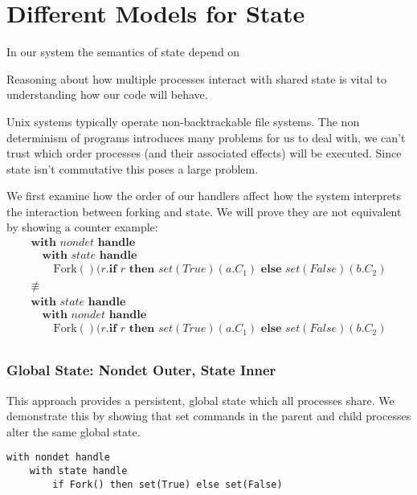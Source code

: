 \documentclass[logo,bsc,singlespacing,parskip]{infthesis}
\begin{document}
\section{Different Models for State}

In our system the semantics of state depend on 

Reasoning about how multiple processes interact with shared state is vital to understanding how our code will behave. 

Unix systems typically operate non-backtrackable file systems. The non determinism of programs introduces many problems for us to deal with, we can't trust which order processes (and their associated effects) will be executed. Since state isn't commutative this poses a large problem.

We first examine how the order of our handlers affect how the system interprets the interaction between forking and state. We will prove they are not equivalent by showing a counter example:
\[
\begin{array}{l}
\textbf{with } \mathit{nondet} \textbf{ handle } \\
\quad \textbf{with } \mathit{state} \textbf{ handle } \\
\quad\quad \text{Fork}()(r. \textbf{if } r \textbf{ then } set(True)(a.C_1) \textbf{ else } set(False)(b.C_2) \\[5pt]
\not\equiv\quad  \\
\textbf{with } \mathit{state} \textbf{ handle } \\
\quad \textbf{with } \mathit{nondet} \textbf{ handle } \\
\quad\quad \text{Fork}()(r. \textbf{if } r \textbf{ then } set(True)(a.C_1) \textbf{ else } set(False)(b.C_2) \\[5pt]
\end{array}
\]

\subsubsection*{Global State: Nondet Outer, State Inner}
This approach provides a persistent, global state which all processes share. We demonstrate this by showing that set commands in the parent and child processes alter the same global state.



\begin{lstlisting}
with nondet handle
    with state handle
        if Fork() then set(True) else set(False)
\end{lstlisting}
\end{document}
